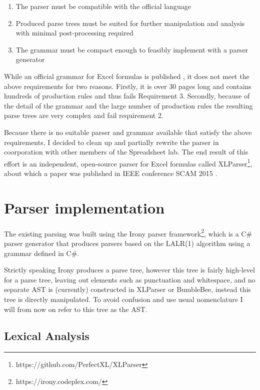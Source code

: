\begin{enumerate}
\label{sec:designgoals}
\item The parser must be compatible with the official language
\item Produced parse trees must be suited for further manipulation and analysis with minimal post-processing required
\item The grammar must be compact enough to feasibly implement with a parser generator
\end{enumerate}

While an official grammar for Excel formulas is published \cite{ExcelOfficialGrammar}, it does not meet the above requirements for two reasons.
Firstly, it is over 30 pages long and contains hundreds of production rules and thus fails Requirement 3.
Secondly, because of the detail of the grammar and the large number of production rules the resulting parse trees are very complex and fail requirement 2.

Because there is no suitable parser and grammar available that satisfy the above requirements, I decided to clean up and partially rewrite the parser in coorporation with other members of the Spreadsheet lab.
The end result of this effort is an independent, open-source parser for Excel formulas called XLParser\footnote{https://github.com/PerfectXL/XLParser}, about which a paper was published in IEEE conference SCAM 2015 \cite{xlparser}.

\section{Parser implementation}

The existing parsing was built using the Irony parser framework\footnote{https://irony.codeplex.com/}, which is a C\# parser generator that produces parsers based on the LALR(1) algorithm using a grammar defined in C\#.

Strictly speaking Irony produces a parse tree, however this tree is fairly high-level for a parse tree, leaving out elements such as punctuation and whitespace, and no separate AST is (currently) constructed in XLParser or BumbleBee, instead this tree is directly manipulated.
To avoid confusion and use usual nomenclature I will from now on refer to this tree as the AST.

\subsection{Lexical Analysis}
\label{sec:lexanalysis}

